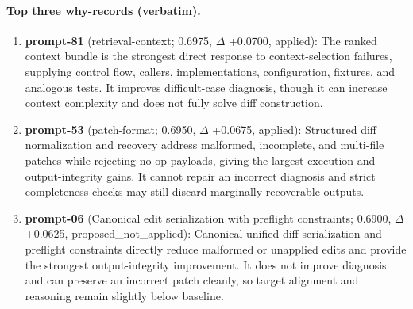 \paragraph{Top three why-records (verbatim).}\begin{enumerate}\itemsep1pt
\item \textbf{prompt-81} (retrieval-context; 0.6975, $\Delta$ +0.0700, applied): The ranked context bundle is the strongest direct response to context-selection failures, supplying control flow, callers, implementations, configuration, fixtures, and analogous tests. It improves difficult-case diagnosis, though it can increase context complexity and does not fully solve diff construction.
\item \textbf{prompt-53} (patch-format; 0.6950, $\Delta$ +0.0675, applied): Structured diff normalization and recovery address malformed, incomplete, and multi-file patches while rejecting no-op payloads, giving the largest execution and output-integrity gains. It cannot repair an incorrect diagnosis and strict completeness checks may still discard marginally recoverable outputs.
\item \textbf{prompt-06} (Canonical edit serialization with preflight constraints; 0.6900, $\Delta$ +0.0625, proposed\_not\_applied): Canonical unified-diff serialization and preflight constraints directly reduce malformed or unapplied edits and provide the strongest output-integrity improvement. It does not improve diagnosis and can preserve an incorrect patch cleanly, so target alignment and reasoning remain slightly below baseline.
\end{enumerate}
